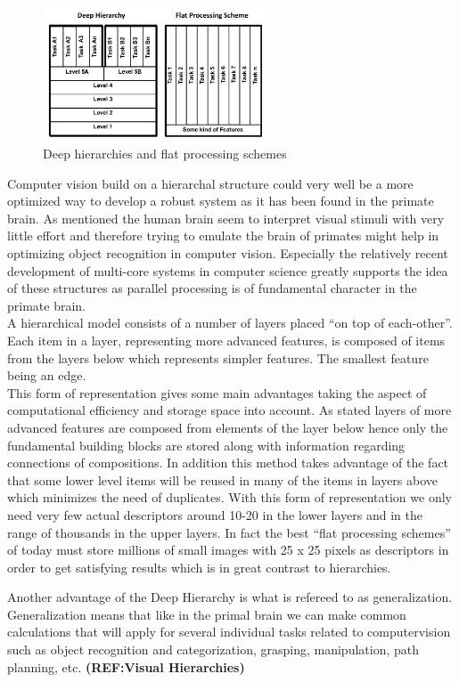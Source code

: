 \begin{figure}[h!] %
\centering
\includegraphics[width=0.6\textwidth]{graphics/deepvsflat}
\caption{Deep hierarchies and flat processing schemes}
\label{fig:deepvsflat}
\end{figure}

Computer vision build on a hierarchal structure could very well be a more optimized way to develop a robust system as it has been found in the primate brain. As mentioned the human brain seem to interpret visual stimuli with very little effort and therefore trying to emulate the brain of primates might help in optimizing object recognition in computer vision. Especially the relatively recent development of multi-core systems in computer science greatly supports the idea of these structures as parallel processing is of fundamental character in the primate brain.\citep{fidler2009learning}  \\
A hierarchical model consists of a number of layers placed “on top of each-other”. Each item in a layer, representing more advanced features, is composed of items from the layers below which represents simpler features. The smallest feature being an edge. \\
This form of representation gives some main advantages taking the aspect of computational efficiency and storage space into account. As stated layers of more advanced features are composed from elements of the layer below hence only the fundamental building blocks are stored along with information regarding connections of compositions. In addition this method takes advantage of the fact that some lower level items will be reused in many of the items in layers above which minimizes the need of duplicates. With this form of representation we only need very few actual descriptors around 10-20 in the lower layers and in the range of thousands in the upper layers\citep{fidler2009learning}. 
In fact the best “flat processing schemes” of today must store millions of small images with 25 x 25 pixels as descriptors in order to get satisfying results which is in great contrast to hierarchies.\citep{fidler2009learning}

Another advantage of the Deep Hierarchy is what is refereed to as generalization. Generalization means that like in the primal brain we can make common calculations that will apply for several individual tasks related to computervision such as object recognition and categorization, grasping, manipulation, path planning, etc. \textbf{(REF:Visual Hierarchies)}
